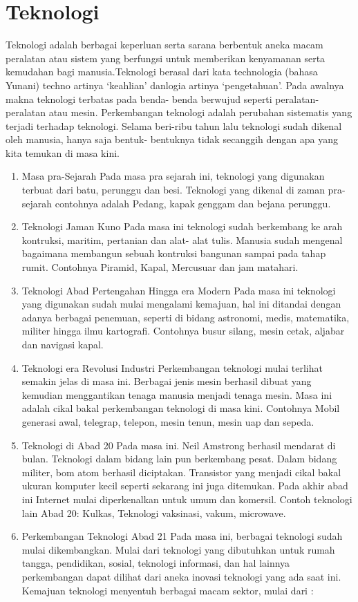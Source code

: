 \section{Teknologi}
Teknologi adalah berbagai keperluan serta sarana berbentuk aneka macam peralatan atau sistem yang berfungsi untuk memberikan kenyamanan serta kemudahan bagi manusia.Teknologi berasal dari kata technologia (bahasa Yunani) techno artinya ‘keahlian’ danlogia artinya ‘pengetahuan’. Pada awalnya makna teknologi terbatas pada benda- benda berwujud seperti peralatan- peralatan atau mesin. Perkembangan teknologi adalah perubahan sistematis yang terjadi terhadap teknologi. Selama beri-ribu tahun lalu teknologi sudah dikenal oleh manusia, hanya saja bentuk- bentuknya tidak secanggih dengan apa yang kita temukan di masa kini.
\begin{enumerate}
	\item Masa pra-Sejarah
Pada masa pra sejarah ini, teknologi yang digunakan terbuat dari batu, perunggu dan besi. Teknologi yang dikenal di zaman pra-sejarah contohnya adalah Pedang, kapak genggam dan bejana perunggu.
	\item Teknologi Jaman Kuno
Pada masa ini teknologi sudah berkembang ke arah kontruksi, maritim, pertanian dan alat- alat tulis. Manusia sudah mengenal bagaimana membangun sebuah kontruksi bangunan sampai pada tahap rumit. Contohnya Piramid, Kapal, Mercusuar dan jam matahari.
	\item Teknologi Abad Pertengahan Hingga era Modern
Pada masa ini teknologi yang digunakan sudah mulai mengalami kemajuan, hal ini ditandai dengan adanya berbagai penemuan, seperti di bidang astronomi, medis, matematika, militer hingga ilmu kartografi. Contohnya busur silang, mesin cetak, aljabar dan navigasi kapal.
	\item Teknologi era Revolusi Industri
Perkembangan teknologi mulai terlihat semakin jelas di masa ini. Berbagai jenis mesin berhasil dibuat yang kemudian menggantikan tenaga manusia menjadi tenaga mesin. Masa ini adalah cikal bakal perkembangan teknologi di masa kini. Contohnya Mobil generasi awal, telegrap, telepon, mesin tenun, mesin uap dan sepeda.
	\item Teknologi di Abad 20
Pada masa ini. Neil Amstrong berhasil mendarat di bulan. Teknologi dalam bidang lain pun berkembang pesat. Dalam bidang militer, bom atom berhasil diciptakan. Transistor yang menjadi cikal bakal ukuran komputer kecil seperti sekarang ini juga ditemukan. Pada akhir abad ini Internet mulai diperkenalkan untuk umum dan komersil. Contoh teknologi lain Abad 20: Kulkas, Teknologi vaksinasi, vakum, microwave.
	\item Perkembangan Teknologi Abad 21
Pada masa ini, berbagai teknologi sudah mulai dikembangkan. Mulai dari teknologi yang dibutuhkan untuk rumah tangga, pendidikan, sosial, teknologi informasi, dan hal lainnya perkembangan dapat dilihat dari aneka inovasi teknologi yang ada saat ini. Kemajuan teknologi menyentuh berbagai macam sektor, mulai dari :
\end{enumerate}
